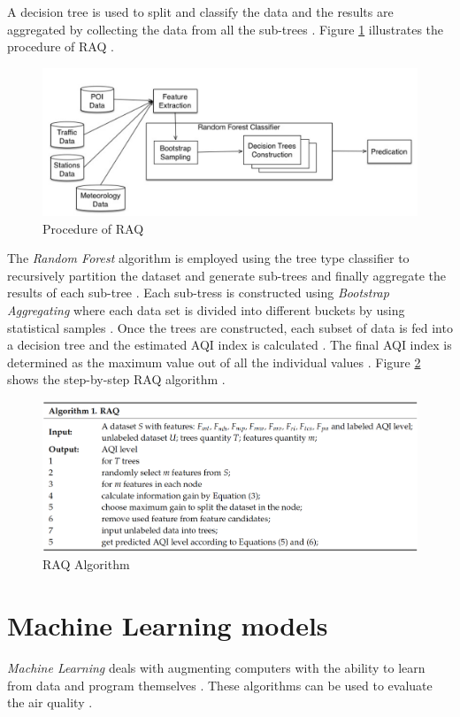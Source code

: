 \documentclass[sigconf]{acmart}
\begin{document}
A decision tree is used to split and classify the data and the results are aggregated by collecting the data from all the sub-trees \cite{raq2016}. Figure \ref{fig:Fig5} illustrates the procedure of RAQ \cite{raq2016}.

\begin{figure}
\includegraphics[width=1.0\textwidth]{images/fig5.png}
\caption{Procedure of RAQ \cite{raq2016}}
\label{fig:Fig5}
\end{figure}

The {\em Random Forest} algorithm is employed using the tree type classifier to recursively partition the dataset and generate sub-trees and finally aggregate the results of each sub-tree \cite{raq2016}. Each sub-tress is constructed using {\em Bootstrap Aggregating} where each data set is divided into different buckets by using statistical samples \cite{raq2016}. Once the trees are constructed, each subset of data is fed into a decision tree and the estimated AQI index is calculated \cite{raq2016}. The final AQI index is determined as the maximum value out of all the individual values \cite{raq2016}. Figure \ref{fig:Fig6} shows the step-by-step RAQ algorithm \cite{raq2016}.

\begin{figure}
\includegraphics[width=1.0\textwidth]{images/fig6.png}
\caption{RAQ Algorithm \cite{raq2016}}
\label{fig:Fig6}
\end{figure}

\section{Machine Learning models}
{\em Machine Learning} deals with augmenting computers with the ability to learn from data and program themselves \cite{gagan2017}. These algorithms can be used to evaluate the air quality \cite{gagan2017}. 
\end{document}
